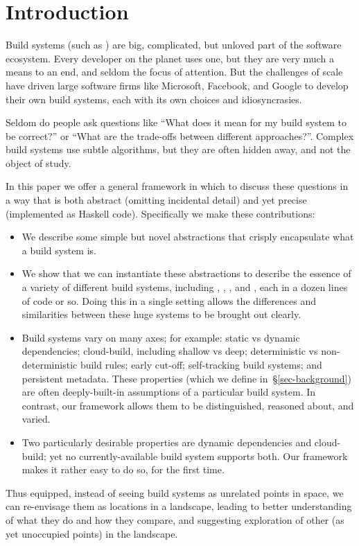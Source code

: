 \section{Introduction}\label{sec-intro}

Build systems (such as \Make) are big, complicated, but unloved part of
the software ecosystem.  Every developer on the planet uses one, but
they are very much a means to an end, and seldom the focus of
attention.  But the challenges of scale have driven large software firms
like Microsoft, Facebook, and Google to develop their own build
systems, each with its own choices and idiosyncrasies.

Seldom do people ask questions like ``What does it mean for my build
system to be correct?'' or ``What are the trade-offs between different
approaches?''.  Complex build systems use subtle algorithms, but they
are often hidden away, and not the object of study.

In this paper we offer a general framework in which to discuss these
questions in a way that is both abstract (omitting incidental detail)
and yet precise (implemented as Haskell code).  Specifically we make
these contributions:
\begin{itemize}
\item We describe some simple but novel abstractions that
crisply encapsulate what a build system is.
\item We show that we can instantiate
these abstractions to describe the essence of a variety of different
build systems, including \Make, \Shake, \Bazel, and \Excel, each in
a dozen lines of code or so.
Doing this in a single setting allows
the differences and similarities between these huge systems to be
brought out clearly.
\item Build systems vary on many axes;
for example: static vs dynamic dependencies; cloud-build, including
shallow vs deep; deterministic vs non-deterministic build rules;
early cut-off; self-tracking build systems; and persistent metadata.
These properties (which we define in~\S\ref{sec-background}) are often
deeply-built-in assumptions of a particular build system.
In contrast, our framework allows them to be distinguished,
reasoned about, and varied.
\item Two particularly desirable properties are dynamic dependencies
and cloud-build; yet no currently-available build system supports
both.  Our framework makes it rather easy to do so, for the first
time.
\end{itemize}
Thus equipped, instead of seeing build systems as unrelated
points in space, we can re-envisage them as locations in a landscape,
leading to better understanding of what they do and how they compare,
and suggesting exploration of other (as yet unoccupied points) in the
landscape.

